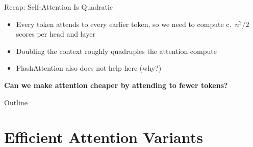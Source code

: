 \documentclass[11pt,compress,t,notes=noshow, xcolor=table]{beamer}
\begin{document}
\begin{frame}{Recap: Self-Attention Is Quadratic}

\vfill

\begin{itemize}
  \item Every token attends to every earlier token, so we need to compute c.\ $n^2/2$ scores per head and layer
  \item Doubling the context roughly quadruples the attention compute
  \item FlashAttention also does not help here (why?)
\end{itemize}

\medskip
\medskip


\begin{center}
\end{center}


\vfill

\end{frame}



\begin{frame}
\vfill
\medskip
\medskip
\centering\LARGE\bfseries Can we make attention cheaper by attending to fewer tokens?
\vfill
\end{frame}



\begin{frame}{Outline}
\tableofcontents
\end{frame}


\section{Efficient Attention Variants}
\end{document}
